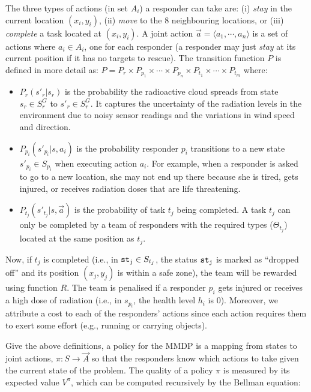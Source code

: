 The three types of actions  (in set $A_i$) a responder can take
are: (i) {\em stay} in the current location $(x_i, y_i)$, (ii) {\em
move} to the 8 neighbouring locations, or (iii) {\em complete} a
task located at $(x_i, y_i)$. A joint action $\vec{a}=\langle a_1,
\cdots, a_n \rangle$ is a set of actions where $a_i\in A_i$, one
for each responder (a responder may just \emph{stay} at its current
position if it has no targets to rescue). The transition function
$P$ is defined in more detail as: $P= P_r \times P_{p_1} \times
\cdots \times P_{p_n} \times P_{t_1} \times \cdots \times P_{t_m}$
where:
\begin{itemize}
    \itemsep=-2pt
    \item $P_r(s'_r|s_r)$ is the probability the radioactive
        cloud spreads from state $s_r\in S^G_r$ to $s'_r\in
        S^G_r$. It captures the uncertainty of the  radiation
        levels in the environment due to  noisy sensor readings
        and the variations in wind speed and direction.
    \item $P_{p_i}(s'_{p_i}|s, a_i)$ is the probability
        responder $p_i$ transitions to a new state $s'_{p_i}\in
        S_{p_i}$ when executing action $a_i$. For example, when
        a responder is asked to go to a new location,  she
        may not end up there because  she is tired,
        gets injured, or receives radiation doses that are life
        threatening.
    \item $P_{t_j}(s'_{t_j}|s, \vec{a})$ is the probability
        of task $t_j$ being completed. A task $t_j$ can only be completed by a
        team of responders with the required types ($\Theta_{t_j}$) located at the
        same position as $t_j$.
\end{itemize}

Now,  if  $t_j$ is completed (i.e., in ${\tt st_j}\in S_{t_j}$, the
status ${\tt st_j}$ is marked as ``dropped off'' and its position $(x_j,
y_j)$ is within a safe zone), the team will be rewarded using
function $R$. The team is penalised if a responder $p_i$ gets
injured or receives a high dose of radiation (i.e., in $s_{p_i}$,
the health level $h_i$ is 0). Moreover, we attribute a cost to each
of the responders' actions since  each  action requires them to
exert some effort (e.g., running or carrying objects).


Give the above definitions, a policy for the MMDP is a mapping from
states to joint actions, $\pi: S \rightarrow \vec{A}$ so that the
responders know which actions to take given the current state of
the problem. The quality of a policy $\pi$ is  measured by
its expected value $V^\pi$, which can be computed recursively by
the Bellman equation:

